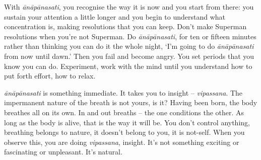 With \textit{\=an\=ap\=anasati}, you recognise the way it is now and you start from there: you sustain your attention a little longer and you begin to understand what concentration is, making resolutions that you can keep. Don't make Superman resolutions when you're not Superman. Do \textit{\=an\=ap\=anasati}, for ten or fifteen minutes rather than thinking you can do it the whole night, `I'm going to do \textit{\=an\=ap\=anasati} from now until dawn.' Then you fail and become angry. You set periods that you know you can do. Experiment, work with the mind until you understand how to put forth effort, how to relax.

\textit{\=an\=ap\=anasati} is something immediate. It takes you to insight -- \textit{vipassana}. The impermanent nature of the breath is not yours, is it? Having been born, the body breathes all on its own. In and out breaths -- the one conditions the other. As long as the body is alive, that is the way it will be. You don't control anything, breathing belongs to nature, it doesn't belong to you, it is not-self. When you observe this, you are doing \textit{vipassana}, insight. It's not something exciting or fascinating or unpleasant. It's natural.

